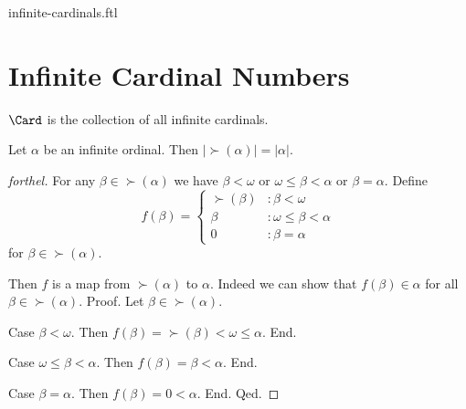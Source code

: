 \documentclass{naproche-library}
\begin{document}
\begin{smodule}{infinite-cardinals.ftl}

  
  \begin{forthel}
  \end{forthel}

  \section*{Infinite Cardinal Numbers}

  \begin{definition}[forthel,id=SET_THEORY_07_4231078585827328]
    $\Card$ is the collection of all infinite cardinals.
  \end{definition}

  \begin{proposition}[forthel,id=SET_THEORY_07_8189062544359424]
    Let $\alpha$ be an infinite ordinal.
    Then $|\succ(\alpha)| = |\alpha|$.
  \end{proposition}
  \begin{proof}[forthel]
    For any $\beta \in \succ(\alpha)$ we have
    $\beta < \omega$ or $\omega \leq \beta < \alpha$ or $\beta = \alpha$.
    Define \[ f(\beta) =
      \begin{cases}
        \succ(\beta)  & : \beta < \omega
        \\
        \beta         & : \omega \leq \beta < \alpha
        \\
        0             & : \beta = \alpha
      \end{cases} \]
    for $\beta \in \succ(\alpha)$.

    Then $f$ is a map from $\succ(\alpha)$ to $\alpha$.
    Indeed we can show that $f(\beta) \in \alpha$ for all
    $\beta \in \succ(\alpha)$. \newline
    Proof.
      Let $\beta \in \succ(\alpha)$.

      Case $\beta < \omega$.
        Then $f(\beta)
          = \succ(\beta)
          < \omega
          \leq \alpha$.
      End.

      Case $\omega \leq \beta < \alpha$.
        Then $f(\beta)
          = \beta
          < \alpha$.
      End.

      Case $\beta = \alpha$.
        Then $f(\beta)
          = 0
          < \alpha$.
      End.
    Qed.


\end{proof}
\end{smodule}
\end{document}
